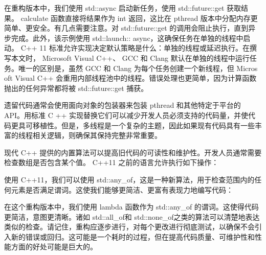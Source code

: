 在重构版本中，我们使用 std::async 启动新任务，使用 std::future::get 获取结果。 calculate 函数直接将结果作为 int 返回，这比在 pthread 版本中分配内存更简单、更安全。有几点需要注意。对 std::future::get 的调用会阻止执行，直到异步完成。此外，该示例使用 std::launch:: async，这确保任务在单独的线程中启动。 C++ 11 标准允许实现决定默认策略是什么：单独的线程或延迟执行。在撰写本文时， Microsoft Visual C++、 GCC 和 Clang 默认在单独的线程中运行任务。唯一的区别是，虽然 GCC 和 Clang 为每个任务创建一个新线程，但 Micros oft Visual C++ 会重用内部线程池中的线程。错误处理也更简单，因为计算函数抛出的任何异常都将被 std::future::get 捕获。

遗留代码通常会使用面向对象的包装器来包装 pthread 和其他特定于平台的 API。用标准 C ++ 实现替换它们可以减少开发人员必须支持的代码量，并使代码更具可移植性。但是，多线程是一个复杂的主题，因此如果现有代码具有一些丰富的线程相关逻辑，则确保其保持完整非常重要。

现代 C++ 提供的内置算法可以提高旧代码的可读性和维护性。开发人员通常需要检查数组是否包含某个值。 C++11 之前的语言允许执行如下操作：


使用 C++11，我们可以使用 std::any\_of，这是一种新算法，用于检查范围内的任何元素是否满足谓词。这使我们能够更简洁、更富有表现力地编写代码：


在这个重构版本中，我们使用 lambda 函数作为 std::any\_of 的谓词。这使得代码更简洁，意图更清晰。诸如 std::all\_of和 std::none\_of之类的算法可以清楚地表达类似的检查。请记住，重构应逐步进行，对每个更改进行彻底测试，以确保不会引入新的错误或回归。这可能是一个耗时的过程，但在提高代码质量、可维护性和性能方面的好处可能是巨大的。











